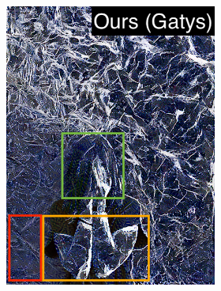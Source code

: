\begin{figure}[]
\begin{subfigure}{0.6\textwidth}
\begin{subfigure}{0.48\textwidth}
            \includegraphics[width=\textwidth]{images/04-experiment02/human/marble/gatys_proj_highlighted2.jpg}
            \caption*{}
        \end{subfigure}
        \hfill
        \begin{subfigure}{0.48\textwidth}
            \centering
            \begin{subfigure}{0.32\textwidth}
                \centering

\end{subfigure}
\end{subfigure}
\end{subfigure}
\end{figure}

